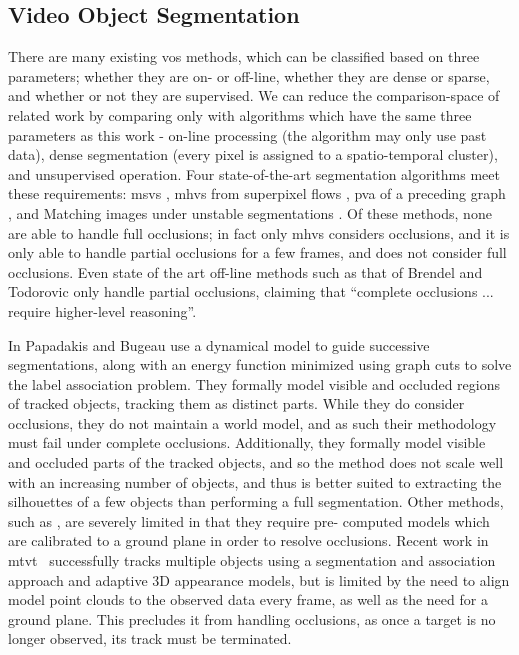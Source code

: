 \subsection{Video Object Segmentation}
There are many existing \gls{vos} methods, which can be classified based on three parameters; whether they are on- or off-line, whether they are dense or sparse, and whether or not they are supervised. We can reduce the comparison-space of related work by comparing only with algorithms which have the same three parameters as this work - on-line processing (the algorithm may only use past data), dense segmentation (every pixel is assigned to a spatio-temporal cluster), and unsupervised operation. Four state-of-the-art segmentation algorithms meet these requirements: \gls{msvs} \cite{MSVS}, \gls{mhvs} from superpixel flows \cite{MHVS}, \gls{pva} of a preceding graph \cite{PropValAgg}, and Matching images under unstable segmentations \cite{MatchingUnstable}.  Of these methods, none are able to handle full occlusions; in fact only \gls{mhvs} considers occlusions, and it is only able to handle partial occlusions for a few frames, and does not consider full occlusions. Even state of the art off-line methods such as that of Brendel and Todorovic \cite{SegTrackRegions} only handle partial occlusions, claiming that ``complete occlusions ... require higher-level reasoning''.  

In \cite{TrackingOcclusionsGraphCuts} Papadakis and Bugeau use a dynamical model to guide successive segmentations, along with an energy function minimized using graph cuts to solve the label association problem. They formally model visible and occluded regions of tracked objects, tracking them as distinct parts. While they do consider occlusions, they do not maintain a world model, and as such their methodology must fail under complete occlusions.  Additionally, they formally model visible and occluded parts of the tracked objects, and so the method does not scale well with an increasing number of objects, and thus is better suited to extracting the silhouettes of a few objects than performing a full segmentation. Other methods, such as \cite{LayeredGraphicalModels}, are severely limited in that they require pre-
computed models which are calibrated to a ground plane in order to resolve occlusions. Recent work in \gls{mtvt}~\cite{MultiObjectTracking} successfully tracks multiple objects using a segmentation and association approach and adaptive 3D appearance models, but is limited by the need to align model point clouds to the observed data every frame, as well as the need for a ground plane. This precludes it from handling occlusions, as once a target is no longer observed, its track must be terminated.

